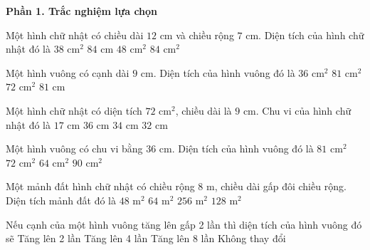 \textbf{Phần 1. Trắc nghiệm lựa chọn}

\begin{ex} %
Một hình chữ nhật có chiều dài $12\text{ cm}$ và chiều rộng $7\text{ cm}$. Diện tích của hình chữ nhật đó là
\choice
{$38\text{ cm}^2$}
{$84\text{ cm}$}
{$48\text{ cm}^2$}
{\True $84\text{ cm}^2$}
\end{ex}

\begin{ex} %
Một hình vuông có cạnh dài $9\text{ cm}$. Diện tích của hình vuông đó là
\choice
{$36\text{ cm}^2$}
{\True $81\text{ cm}^2$}
{$72\text{ cm}^2$}
{$81\text{ cm}$}
\end{ex}

\begin{ex} %
Một hình chữ nhật có diện tích $72\text{ cm}^2$, chiều dài là $9\text{ cm}$. Chu vi của hình chữ nhật đó là
\choice
{$17\text{ cm}$}
{$36\text{ cm}$}
{\True $34\text{ cm}$}
{$32\text{ cm}$}
\end{ex}

\begin{ex} %
Một hình vuông có chu vi bằng $36\text{ cm}$. Diện tích của hình vuông đó là
\choice
{\True $81\text{ cm}^2$}
{$72\text{ cm}^2$}
{$64\text{ cm}^2$}
{$90\text{ cm}^2$}
\end{ex}

\begin{ex} %
Một mảnh đất hình chữ nhật có chiều rộng $8\text{ m}$, chiều dài gấp đôi chiều rộng. Diện tích mảnh đất đó là
\choice
{$48\text{ m}^2$}
{$64\text{ m}^2$}
{$256\text{ m}^2$}
{\True $128\text{ m}^2$}
\end{ex}

\begin{ex} %
Nếu cạnh của một hình vuông tăng lên gấp 2 lần thì diện tích của hình vuông đó sẽ
\choice
{Tăng lên 2 lần}
{\True Tăng lên 4 lần}
{Tăng lên 8 lần}
{Không thay đổi}
\end{ex}

